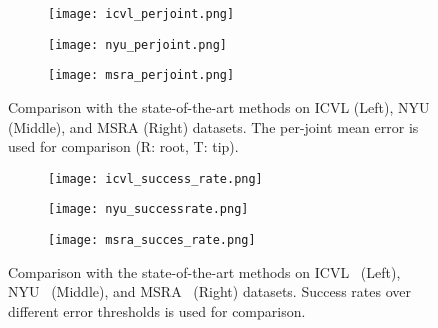 \documentclass{article}
\begin{document}
\begin{figure}
    \centering 
    \begin{subfigure}[b]{0.32\linewidth}  
        \centering 
\texttt{[image: icvl\_perjoint.png]} 
\end{subfigure} \begin{subfigure}[b]{0.32\linewidth} 
        \centering 
\texttt{[image: nyu\_perjoint.png]} 
\end{subfigure}
    \begin{subfigure}[b]{0.32\linewidth} 
        \centering 
\texttt{[image: msra\_perjoint.png]} 
\end{subfigure} 
    \caption{Comparison with the state-of-the-art methods on ICVL \cite{tang2014latent} (Left), NYU \cite{tompson2014real} (Middle), and MSRA \cite{sun2015cascaded} (Right) datasets. The per-joint mean error is used for comparison (R: root, T: tip).} 
    \label{fig:perjoint}  
\end{figure} 
\begin{figure} 
    \centering 
    \begin{subfigure}[b]{0.32\linewidth}  
        \centering 
\texttt{[image: icvl\_success\_rate.png]} 
\end{subfigure} \begin{subfigure}[b]{0.32\linewidth} 
        \centering 
\texttt{[image: nyu\_successrate.png]} 
\end{subfigure}
    \begin{subfigure}[b]{0.32\linewidth} 
        \centering 
\texttt{[image: msra\_succes\_rate.png]} 
\end{subfigure} 
    \caption{Comparison with the state-of-the-art methods on ICVL~\cite{tang2014latent} (Left), NYU~\cite{tompson2014real} (Middle), and MSRA~\cite{sun2015cascaded} (Right) datasets. Success rates over different error thresholds is used for comparison.} 
    \label{fig:sucrate}  
\end{figure}     
\end{document}
